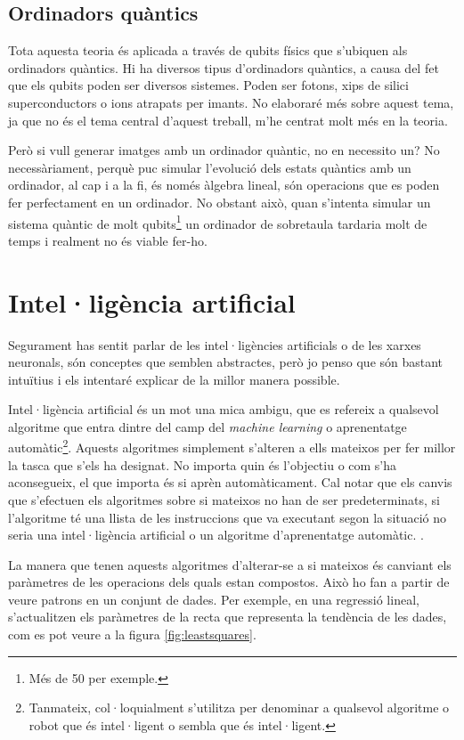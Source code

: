 \section{Ordinadors quàntics}
Tota aquesta teoria és aplicada a través de qubits físics que s'ubiquen als ordinadors quàntics. Hi ha diversos tipus d'ordinadors quàntics, a causa del fet que els qubits poden ser diversos sistemes. Poden ser fotons, xips de silici superconductors o ions atrapats per imants. No elaboraré més sobre aquest tema, ja que no és el tema central d'aquest treball, m'he centrat molt més en la teoria.

Però si vull generar imatges amb un ordinador quàntic, no en necessito un? No necessàriament, perquè puc simular l'evolució dels estats quàntics amb un ordinador, al cap i a la fi, és només àlgebra lineal, són operacions que es poden fer perfectament en un ordinador. No obstant això, quan s'intenta simular un sistema quàntic de molt qubits\footnote{Més de 50 per exemple.} un ordinador de sobretaula tardaria molt de temps i realment no és viable fer-ho.


\chapter{Intel·ligència artificial}
\label{ML}
Segurament has sentit parlar de les intel·ligències artificials o de les xarxes neuronals, són conceptes que semblen abstractes, però jo penso que són bastant intuïtius i els intentaré explicar de la millor manera possible.

Intel·ligència artificial és un mot una mica ambigu, que es refereix a qualsevol algoritme que entra dintre del camp del \textit{machine learning} o aprenentatge automàtic\footnote{Tanmateix, col·loquialment s'utilitza per denominar a qualsevol algoritme o robot que és intel·ligent o sembla que és intel·ligent. }. Aquests algoritmes simplement s'alteren a ells mateixos per fer millor la tasca que s'els ha designat. No importa quin és l'objectiu o com s'ha aconsegueix, el que importa és si aprèn automàticament. Cal notar que els canvis que s'efectuen els algoritmes sobre si mateixos no han de ser predeterminats, si l'algoritme té una llista de les instruccions que va executant segon la situació no seria una intel·ligència artificial o un algoritme d'aprenentatge automàtic.  \cite{deeplearning}.

La manera que tenen aquests algoritmes d'alterar-se a si mateixos és canviant els paràmetres de les operacions dels quals estan compostos. Això ho fan a partir de veure patrons en un conjunt de dades. Per exemple, en una regressió lineal, s'actualitzen els paràmetres de la recta que representa la tendència de les dades, com es pot veure a la figura \ref{fig:leastsquares}.

